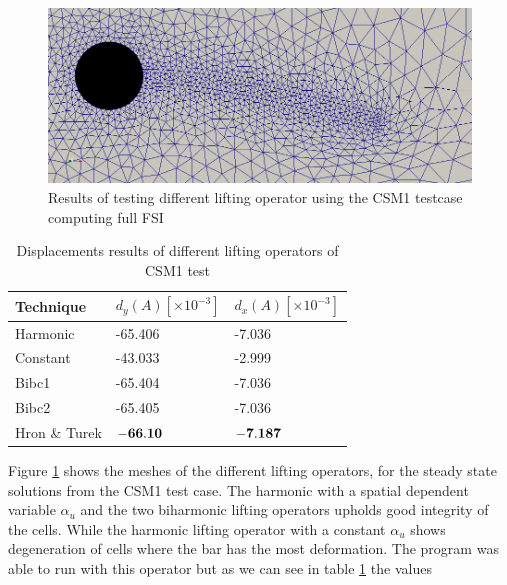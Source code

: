 \begin{figure}[H]
\begin{minipage}[b]{0.6\linewidth}
    \caption{Biharmonic lifting operator with boundary condition 1} 
    \vspace{4ex}
  \end{minipage}%
  \begin{minipage}[b]{0.6\linewidth}
    \centering
    \includegraphics[scale=0.25]{./Mesh_motion_results/CSM1_bibc2.png} 
    \caption{Biharmonic lifting operator with boundary conditions 2} 
    \vspace{4ex}
  \end{minipage} 
  \caption{Results of testing different lifting operator using the CSM1 testcase computing full FSI}
  \label{fig:CSM1_pictures} 
\end{figure}

\begin{table}[H]
\centering
\caption{Displacements results of different lifting operators of CSM1 test}
\label{tab:comparing lifting}
\begin{tabular}{|l|l|l|}
\hline
Technique & $d_y(A) [\times 10^{-3}]$ & $d_x(A) [\times 10^{-3}]$ \\ \hline
Harmonic & -65.406 & -7.036 \\ \hline
Constant & -43.033 & -2.999 \\ \hline
Bibc1 & -65.404 & -7.036 \\ \hline
Bibc2 & -65.405 & -7.036 \\ \hline
Hron \& Turek & $\bold{-66.10}$& $\bold{-7.187}$\\ \hline
\end{tabular}
\end{table}

Figure \ref{fig:CSM1_pictures} shows the meshes of the different lifting operators, for the steady state solutions from the CSM1 test case. The harmonic with a spatial dependent variable $\alpha_u$ and the two biharmonic lifting operators upholds good integrity of the cells. While the harmonic lifting operator with a constant $\alpha_u$ shows degeneration of cells where the bar has the most deformation. The program was able to run with this operator but as we can see in table \ref{tab:comparing lifting} the values
